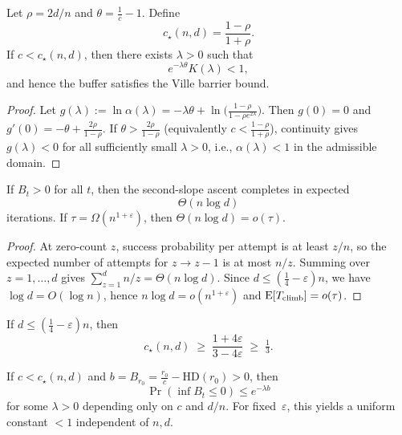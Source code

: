 \begin{lemma}
	Let $\rho=2d/n$ and $\theta=\frac{1}{c}-1$.  
	Define
	\[
	c_\star(n,d)=\frac{1-\rho}{1+\rho}.
	\]
	If $c<c_\star(n,d)$, then there exists $\lambda>0$ such that
	\[
	e^{-\lambda\theta}K(\lambda) < 1,
	\]
	and hence the buffer satisfies the Ville barrier bound.
\end{lemma}

\begin{proof}
	Let $g(\lambda):=\ln\alpha(\lambda)=-\lambda\theta+\ln\!\big(\tfrac{1-\rho}{1-\rho e^{2\lambda}}\big)$. 
	Then $g(0)=0$ and $g'(0)=-\theta+\tfrac{2\rho}{1-\rho}$. 
	If $\theta>\tfrac{2\rho}{1-\rho}$ (equivalently $c<\tfrac{1-\rho}{1+\rho}$), continuity gives $g(\lambda)<0$ for all sufficiently small $\lambda>0$, i.e., $\alpha(\lambda)<1$ in the admissible domain.
\end{proof}


\begin{lemma}%
	If $B_t>0$ for all $t$, then the second-slope ascent completes in expected
	\[
	\Theta(n\log d)
	\]
	iterations.  
	If $\tau=\Omega(n^{1+\varepsilon})$, then $\Theta(n\log d)=o(\tau)$.
\end{lemma}


\begin{proof}
	At zero-count $z$, success probability per attempt is at least $z/n$, so the expected number of attempts for $z\!\to\! z-1$ is at most $n/z$.
	Summing over $z=1,\dots,d$ gives $\sum_{z=1}^{d}n/z=\Theta(n\log d)$.
	Since $d\le(\tfrac14-\varepsilon)n$, we have $\log d=O(\log n)$, hence $n\log d=o(n^{1+\varepsilon})$ and $\text{E}[T_{\mathrm{climb}}]=o(\tau)$.
\end{proof}



\begin{corollary}%
	\label{cor:c-floor}
	If $d\le (\tfrac14-\varepsilon)n$, then
	\[
	c_\star(n,d) \;\ge\; \frac{1+4\varepsilon}{3-4\varepsilon} \;\ge\; \tfrac13.
	\]
\end{corollary}


\begin{lemma}%
	If $c<c_\star(n,d)$ and 
	$b=B_{r_0}=\frac{r_0}{c}-\mathrm{HD}(r_0)>0$, 
	then 
	\[
	\Pr\!\left(\inf B_t \le 0\right) \le e^{-\lambda b}
	\]
	for some $\lambda>0$ depending only on $c$ and $d/n$.  
	For fixed~$\varepsilon$, this yields a uniform constant $<1$ independent of 
	$n,d$.
\end{lemma}

